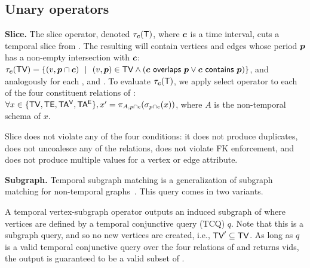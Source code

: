 \subsection{Unary operators}
\label{sec:algebra:unary}


{\bf Slice.}  The slice operator, denoted $\tau_{\boldsymbol{c}}(\mathsf{T})$, where
$\boldsymbol{c}$ is a time interval, cuts a temporal slice from \ttt. The
resulting \tg will contain vertices and edges whose period $\boldsymbol{p}$ has a
non-empty intersection with $\boldsymbol{c}$: $\tau_{\boldsymbol{c}}(\textsf{TV}) = \{ (v, \boldsymbol{p} \cap
\boldsymbol{c})~~|~~(v, \boldsymbol{p}) \in \textsf{TV} \wedge (\boldsymbol{c}~\mathsf{overlaps}~\boldsymbol{p} \vee
\boldsymbol{c}~\mathsf{contains}~\boldsymbol{p}) \}$, and analogously for each \te, \tav and
\tae.  To evaluate $\tau_{\boldsymbol{c}}(\mathsf{T})$, we apply select operator to
each of the four constituent relations of \tve: $\forall x \in
\{\textsf{TV},\textsf{TE},\mathsf{TA^{V}},\mathsf{TA^{E}} \}, x' = \pi_{A,p \cap c}(\sigma_{p \cap c} (x))$,
where $A$ is the non-temporal schema of $x$.


Slice does not violate any of the four conditions: it does not produce
duplicates, does not uncoalesce any of the \tve relations, does not
violate FK enforcement, and does not produce multiple values for a
vertex or edge attribute.


{\bf Subgraph.}  Temporal subgraph matching is a generalization of
subgraph matching for non-temporal graphs~\cite{Wood2012}.  This query
comes in two variants.


A temporal vertex-subgraph operator  outputs an induced
subgraph of \ttt where vertices are defined by a temporal conjunctive
query (TCQ) $q$.  Note that this is a subgraph query, and so no new
vertices are created, i.e., $\textsf{TV}' \subseteq \textsf{TV}$.  As long as $q$ is a
valid temporal conjunctive query over the four relations of \tve and
returns vids, the output is guaranteed to be a valid subset of \tv.

